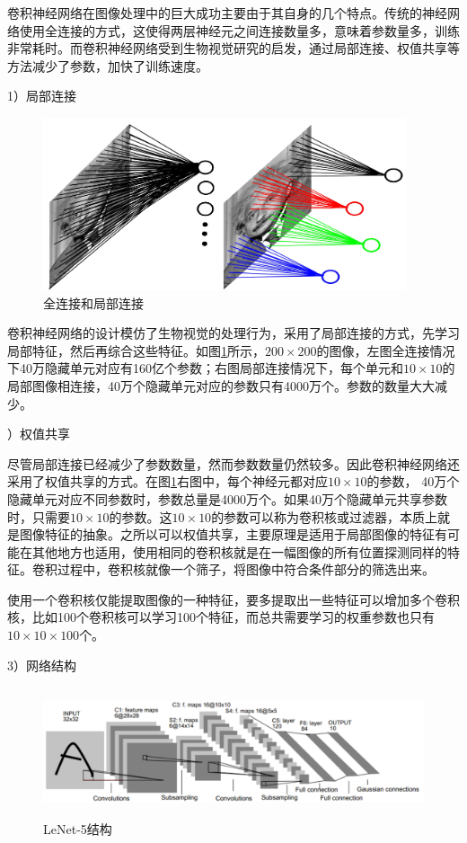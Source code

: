 卷积神经网络在图像处理中的巨大成功主要由于其自身的几个特点。传统的神经网络使用全连接的方式，这使得两层神经元之间连接数量多，意味着参数量多，训练非常耗时。而卷积神经网络受到生物视觉研究的启发，通过局部连接、权值共享等方法减少了参数，加快了训练速度。

1）局部连接

\begin{figure}[thb]
\centering
\includegraphics[height=2in]{./figures/2/2-5}
\caption{全连接和局部连接}
\label{fig:25}
\end{figure}

卷积神经网络的设计模仿了生物视觉的处理行为，采用了局部连接的方式，先学习局部特征，然后再综合这些特征。如图\ref{fig:25}所示，$200 \times 200$的图像，左图全连接情况下40万隐藏单元对应有160亿个参数；右图局部连接情况下，每个单元和$10 \times 10$的局部图像相连接，40万个隐藏单元对应的参数只有4000万个。参数的数量大大减少。

）权值共享

尽管局部连接已经减少了参数数量，然而参数数量仍然较多。因此卷积神经网络还采用了权值共享的方式。在图\ref{fig:25}右图中，每个神经元都对应$10 \times 10$的参数， 40万个隐藏单元对应不同参数时，参数总量是4000万个。如果40万个隐藏单元共享参数时，只需要$10 \times 10$的参数。这$10 \times 10$的参数可以称为卷积核或过滤器，本质上就是图像特征的抽象。之所以可以权值共享，主要原理是适用于局部图像的特征有可能在其他地方也适用，使用相同的卷积核就是在一幅图像的所有位置探测同样的特征。卷积过程中，卷积核就像一个筛子，将图像中符合条件部分的筛选出来。

使用一个卷积核仅能提取图像的一种特征，要多提取出一些特征可以增加多个卷积核，比如100个卷积核可以学习100个特征，而总共需要学习的权重参数也只有$10 \times 10 \times 100$个。

3）网络结构

\begin{figure}[thb]
\centering
\includegraphics[height=1.5in]{./figures/2/2-6}
\caption{LeNet-5结构}
\label{fig:26}
\end{figure}

